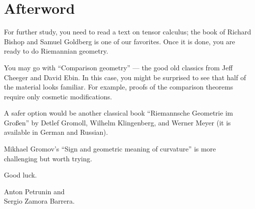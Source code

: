 \chapter*{Afterword}



For further study, you need to read a text on tensor calculus;
the book of Richard Bishop and Samuel Goldberg \cite{bishop-goldberg} is one of our favorites.
Once it is done, you are ready to do Riemannian geometry.

You may go with  ``Comparison geometry'' \cite{cheeger-ebin} --- the good old classics from Jeff Cheeger and David Ebin. 
In this case, you might be surprised to see that half of the material looks familiar.
For example, proofs of the comparison theorems require only cosmetic modifications.

A safer option would be another classical book ``Riemannsche Geometrie im Großen'' \cite{gromoll-klingenberg-meyer} by 
Detlef Gromoll,
Wilhelm Klingenberg, 
and  Werner Meyer (it is available in German and Russian).

Mikhael Gromov's ``Sign and geometric meaning of curvature'' \cite{gromov-1991} is more challenging but worth trying. 

Good luck.

\begin{flushright}
Anton Petrunin and\\
Sergio Zamora Barrera.
\end{flushright}
